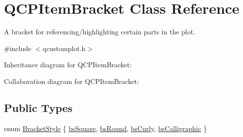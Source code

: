\hypertarget{class_q_c_p_item_bracket}{}\section{Q\+C\+P\+Item\+Bracket Class Reference}
\label{class_q_c_p_item_bracket}


A bracket for referencing/highlighting certain parts in the plot.  




{\ttfamily \#include $<$qcustomplot.\+h$>$}



Inheritance diagram for Q\+C\+P\+Item\+Bracket\+:


Collaboration diagram for Q\+C\+P\+Item\+Bracket\+:
\subsection*{Public Types}
\begin{DoxyCompactItemize}
\item 
enum \hyperlink{class_q_c_p_item_bracket_a7ac3afd0b24a607054e7212047d59dbd}{Bracket\+Style} \{ \hyperlink{class_q_c_p_item_bracket_a7ac3afd0b24a607054e7212047d59dbda7f9df4a7359bfe3dac1dbe4ccf5d220c}{bs\+Square}, 
\hyperlink{class_q_c_p_item_bracket_a7ac3afd0b24a607054e7212047d59dbda394627b0830a26ee3e0a02ca67a9f918}{bs\+Round}, 
\hyperlink{class_q_c_p_item_bracket_a7ac3afd0b24a607054e7212047d59dbda5024ce4023c2d8de4221f1cd4816acd8}{bs\+Curly}, 
\hyperlink{class_q_c_p_item_bracket_a7ac3afd0b24a607054e7212047d59dbda8f29f5ef754e2dc9a9efdedb2face0f3}{bs\+Calligraphic}
 \}
\end{DoxyCompactItemize}

